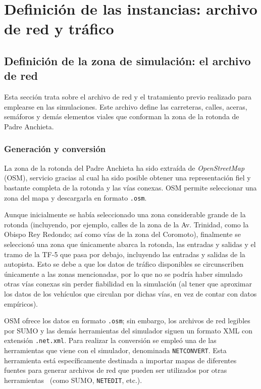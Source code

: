 \chapter{Definición de las instancias: archivo de red y tráfico}
\label{cap:instancias}

\section{Definición de la zona de simulación: el archivo de red}
\label{def_zona_sim_archivo_red}

Esta sección trata sobre el archivo de red y el tratamiento previo realizado para emplearse en las simulaciones. Este archivo define las carreteras, calles, aceras, semáforos y demás elementos viales que conforman la zona de la rotonda de Padre Anchieta.

\subsection{Generación y conversión}
\label{gen_conv}

La zona de la rotonda del Padre Anchieta ha sido extraída de \textit{OpenStreetMap} (OSM), servicio gracias al cual ha sido posible obtener una representación fiel y bastante completa de la rotonda y las vías conexas. OSM permite seleccionar una zona del mapa y descargarla en formato \texttt{.osm}.

Aunque inicialmente se había seleccionado una zona considerable grande de la rotonda (incluyendo, por ejemplo, calles de la zona de la Av. Trinidad, como la Obispo Rey Redondo; así como vías de la zona del Coromoto), finalmente se seleccionó una zona que únicamente abarca la rotonda, las entradas y salidas y el tramo de la TF-5 que pasa por debajo, incluyendo las entradas y salidas de la autopista. Esto se debe a que los datos de tráfico disponibles se circunscriben únicamente a las zonas mencionadas, por lo que no se podría haber simulado otras vías conexas sin perder fiabilidad en la simulación (al tener que aproximar los datos de los vehículos que circulan por dichas vías, en vez de contar con datos empíricos).

OSM ofrece los datos en formato \texttt{.osm}; sin embargo, los archivos de red legibles por SUMO y las demás herramientas del simulador siguen un formato XML con extensión \texttt{.net.xml}. Para realizar la conversión se empleó una de las herramientas que viene con el simulador, denominada \texttt{NETCONVERT}. Esta herramienta está específicamente destinada a importar mapas de diferentes fuentes para generar archivos de red que pueden ser utilizados por otras herramientas~\cite{noauthor_netconvert_nodate} (como SUMO, \texttt{NETEDIT}, etc.).

